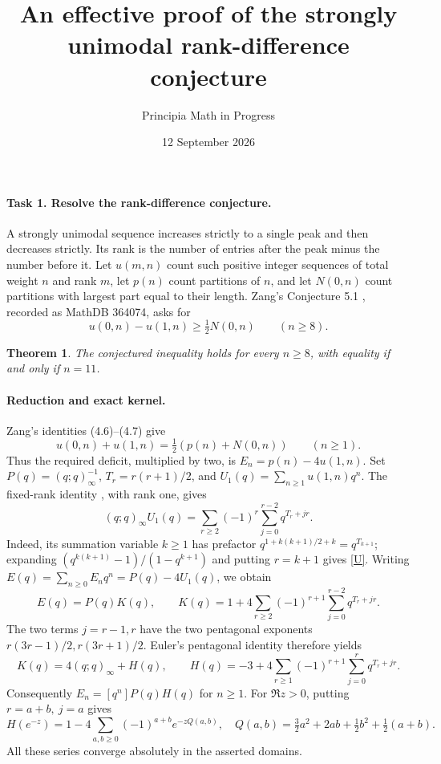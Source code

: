 \documentclass[11pt]{article}
\title{An effective proof of the strongly unimodal rank-difference conjecture}
\author{Principia Math in Progress}
\date{12 September 2026}
\newtheorem{theorem}{Theorem}
\begin{document}
\maketitle

\paragraph{Task 1. Resolve the rank-difference conjecture.}
A strongly unimodal sequence increases strictly to a single peak and then
decreases strictly. Its rank is the number of entries after the peak minus
the number before it. Let \(u(m,n)\) count such positive integer sequences
of total weight \(n\) and rank \(m\), let \(p(n)\) count partitions of \(n\),
and let \(N(0,n)\) count partitions with largest part equal to their length.
Zang's Conjecture 5.1 \cite{Zang}, recorded as MathDB 364074, asks for
\[
 u(0,n)-u(1,n)\geq \tfrac12N(0,n)\qquad(n\geq8).
\]

\begin{theorem}
The conjectured inequality holds for every \(n\geq8\), with equality
if and only if \(n=11\).
\end{theorem}

\paragraph{Reduction and exact kernel.}
Zang's identities (4.6)--(4.7) give
\[
 u(0,n)+u(1,n)=\tfrac12(p(n)+N(0,n))\qquad(n\geq1).
\]
Thus the required deficit, multiplied by two, is
\(E_n=p(n)-4u(1,n)\). Set \(P(q)=(q;q)_\infty^{-1}\),
\(T_r=r(r+1)/2\), and \(U_1(q)=\sum_{n\geq1}u(1,n)q^n\).
The fixed-rank identity \cite[Theorem 1.1]{Peak}, with rank one, gives
\begin{equation}\label{U}
 (q;q)_\infty U_1(q)=
 \sum_{r\geq2}(-1)^r\sum_{j=0}^{r-2}q^{T_r+jr}.
\end{equation}
Indeed, its summation variable \(k\geq1\) has prefactor
\(q^{1+k(k+1)/2+k}=q^{T_{k+1}}\); expanding
\((q^{k(k+1)}-1)/(1-q^{k+1})\) and putting \(r=k+1\) gives
\eqref{U}.
Writing \(E(q)=\sum_{n\geq0}E_nq^n=P(q)-4U_1(q)\), we obtain
\[
 E(q)=P(q)K(q),\qquad
 K(q)=1+4\sum_{r\geq2}(-1)^{r+1}\sum_{j=0}^{r-2}q^{T_r+jr}.
\]
The two terms \(j=r-1,r\) have the two pentagonal exponents
\(r(3r-1)/2,r(3r+1)/2\). Euler's pentagonal identity therefore yields
\[
 K(q)=4(q;q)_\infty+H(q),\qquad
 H(q)=-3+4\sum_{r\geq1}(-1)^{r+1}\sum_{j=0}^r q^{T_r+jr}.
\]
Consequently \(E_n=[q^n]P(q)H(q)\) for \(n\geq1\).
For \(\Re z>0\), putting \(r=a+b,\ j=a\) gives
\begin{equation}\label{theta}
 H(e^{-z})=1-4\sum_{a,b\geq0}(-1)^{a+b}e^{-zQ(a,b)},\quad
 Q(a,b)=\tfrac32a^2+2ab+\tfrac12b^2+\tfrac12(a+b).
\end{equation}
All these series converge absolutely in the asserted domains.
\end{document}
